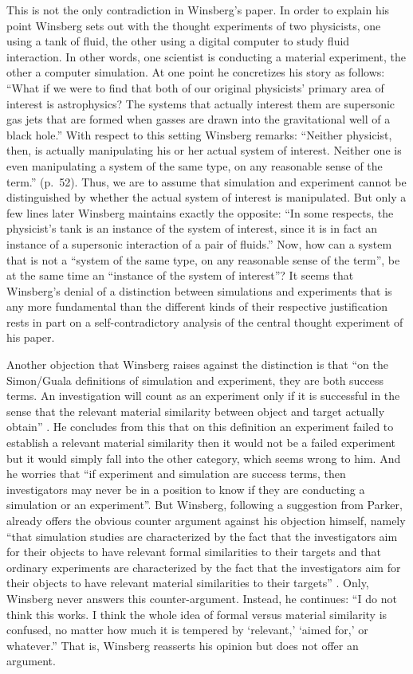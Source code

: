 \documentclass[12pt, a4paper]{article}
\numberwithin{equation}{section}
\begin{document}
This is not the only contradiction in Winsberg's paper. In order to explain his point Winsberg sets out with the thought experiments of two physicists, one using a tank of fluid, the other using a digital computer to study fluid interaction. In other words, one scientist is conducting a material experiment, the other a computer simulation. At one point he concretizes his story as follows: ``What if we were to find that both of our original physicists' primary area of interest is astrophysics? The systems that actually interest them are supersonic gas jets that are formed when gasses are drawn into the gravitational well of a black hole.'' \cite[p.\ 52]{winsberg:2010} With respect to this setting Winsberg remarks: ``Neither physicist, then, is actually manipulating his or her actual system of interest. Neither one is even manipulating a system of the same type, on any reasonable sense of the term.'' (p.\ 52). Thus, we are to assume that simulation and experiment cannot be distinguished by whether the actual system of interest is manipulated. But only a few lines later Winsberg maintains exactly the opposite: ``In some respects, the physicist's tank is an instance of the system of interest, since it is in fact an instance of a supersonic interaction of a pair of fluids.'' Now, how can a system that is not a ``system of the same type, on any reasonable sense of the term'', be at the same time an ``instance of the system of interest''? It seems that Winsberg's denial of a distinction between simulations and experiments that is any more fundamental than the different kinds of their respective justification rests in part on a self-contradictory analysis of the central thought experiment of his paper.

Another objection that Winsberg raises against the distinction is that ``on the Simon/Guala definitions of simulation and experiment, they are both success terms. An investigation will count as an experiment only if it is successful in the sense that the relevant material similarity between object and target actually obtain'' \cite[p.\ 581]{winsberg:2009}. He concludes from this that on this definition an experiment failed to establish a relevant material similarity then it would not be a failed experiment but it would simply fall into the other category, which seems wrong to him. And he worries that ``if experiment and simulation are success terms, then investigators may never be in a position to know if they are conducting a simulation or an experiment''. But Winsberg, following a suggestion from Parker, already offers the obvious counter argument against his objection himself, namely ``that simulation studies are characterized by the fact that the investigators aim for their objects to have relevant formal similarities to their targets and that ordinary experiments are characterized by the fact that the investigators aim for their objects to have relevant material similarities to their targets'' \cite[p.\ 584f.]{winsberg:2009}. Only, Winsberg never answers this counter-argument. Instead, he continues: ``I do not think this works. I think the whole idea of formal versus material similarity is confused, no matter how much it is tempered by `relevant,' `aimed for,' or whatever.'' That is, Winsberg reasserts his opinion but does not offer an argument.
\end{document}
